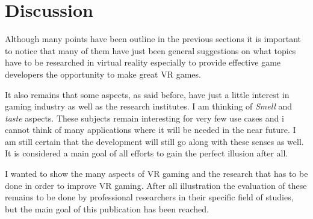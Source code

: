 \section{Discussion}
Although many points have been outline in the previous sections it is important to notice that many of them have just been general suggestions on what topics have to be researched in virtual reality especially to provide effective game developers the opportunity to make great VR games. 

It also remains that some aspects, as said before, have just a little interest in gaming industry as well as the research institutes. I am thinking of \textit{Smell} and \textit{taste} aspects. 
These subjects remain interesting for very few use cases and i cannot think of many applications where it will be needed in the near future. 
I am still certain that the development will still go along with these senses as well. It is considered a main goal of all efforts to gain the perfect illusion after all.

I wanted to show the many aspects of VR gaming and the research that has to be done in order to improve VR gaming. After all illustration the evaluation of these remains to be done by professional researchers in their specific field of studies, but the main goal of this publication has been reached.
